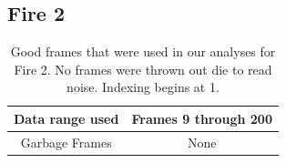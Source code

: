 \documentclass{article}
\begin{document}
\pagebreak

\subsection{Fire 2}



\begin{table}
\centering
\begin{tabular}{|c|c|}
\hline
Data range used & Frames 9 through 200 \\
\hline 
Garbage Frames & None \\
\hline
\end{tabular} 


\caption{Good frames that were used in our analyses for Fire 2. No frames were thrown out die to read noise. Indexing begins at 1.}
\end{table}
\end{document}
